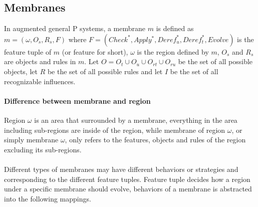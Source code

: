 \documentclass[9pt,a4paper,twoside]{article}
\begin{document}
        
        \subsection{Membranes}
        
            In augmented general P systems, a membrane $m$ is defined as $m=(\omega, O_s, R_s, F)$ where $F = (Check^*, Apply^*, Deref_u^*, Deref_t^*, Evolve)$ is the feature tuple of $m$ (or feature for short), $\omega$ is the region defined by $m$, $O_s$ and $R_s$ are objects and rules in $m$.
            Let $O = O_t \cup O_u \cup O_{rt} \cup O_{ru}$ be the set of all possible objects, let $R$ be the set of all possible rules and let $I$ be the set
            of all recognizable influences.

            \paragraph{Difference between membrane and region}
            Region $\omega$ is an area that surrounded by a membrane, everything in the area including sub-regions are inside of the region, while membrane of region $\omega$, or simply membrane $\omega$, only refers to the features, objects and rules of the region excluding its sub-regions.
            \paragraph*{}
            
            Different types of membranes may have different behaviors or strategies and corresponding to the different feature tuples. Feature tuple decides how a region under a specific membrane should evolve, 
            behaviors of a membrane is abstracted into the following mappings.
        
\end{document}
